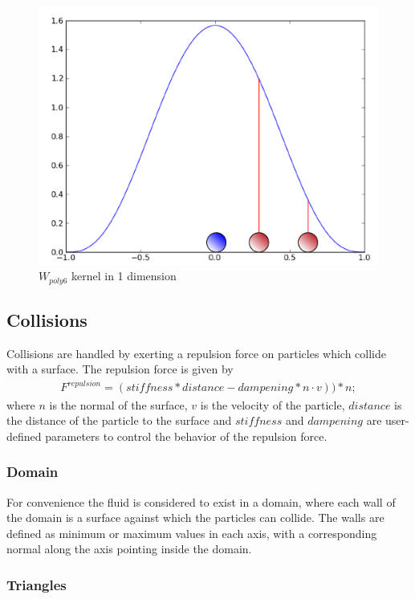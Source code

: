 \begin{figure}[!htc]
 		\centering
		\includegraphics[scale=0.6]{figures/poly6kernel.png}
        \caption{ $W_{poly6}$ kernel in 1 dimension }
		\label{fig:poly6kernel}
\end{figure}


\subsection{Collisions}

Collisions are handled by exerting a repulsion force on particles which collide
with a surface. The repulsion force is given by
\begin{align}
F^{repulsion} = (stiffness * distance - dampening * n \cdot v))*n;
\end{align}
where $n$ is the normal of the surface, $v$ is the velocity of the particle,
$distance$ is the distance of the particle to the surface and
$stiffness$ and $dampening$ are user-defined parameters to control the behavior of
the repulsion force.\cite{Krog2010}

\subsubsection{Domain}
For convenience the fluid is considered to exist in a domain, where each wall
of the domain is a surface against which the particles can collide. The walls
are defined as minimum or maximum values in each axis, with a corresponding
normal along the axis pointing inside the domain. 

\subsubsection{Triangles}

